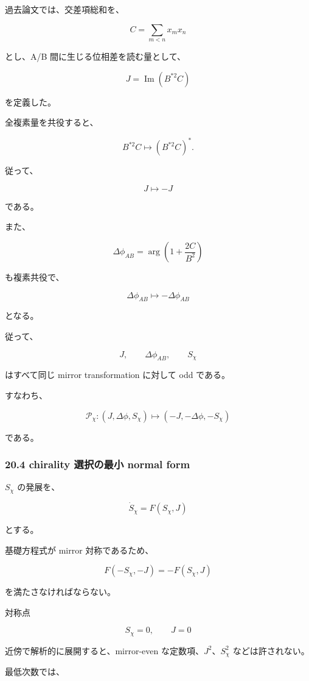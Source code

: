 \documentclass[
  a4paper,
]{ltjsarticle}
\begin{document}
過去論文では、交差項総和を、

\[
C
=
\sum_{m<n}x_mx_n
\]

とし、A/B 間に生じる位相差を読む量として、

\[
\boxed{
J
=
\operatorname{Im}
\left(
B^{*2}C
\right)
}
\tag{156}
\]

を定義した。

全複素量を共役すると、

\[
B^{*2}C
\mapsto
\left(B^{*2}C\right)^*.
\]

従って、

\[
\boxed{
J\mapsto-J
}
\tag{157}
\]

である。

また、

\[
\Delta\phi_{AB}
=
\arg
\left(
1+\frac{2C}{B^2}
\right)
\]

も複素共役で、

\[
\boxed{
\Delta\phi_{AB}
\mapsto
-\Delta\phi_{AB}
}
\tag{158}
\]

となる。

従って、

\[
J,
\qquad
\Delta\phi_{AB},
\qquad
S_\chi
\]

はすべて同じ mirror transformation に対して odd である。

すなわち、

\[
\boxed{
\mathcal P_\chi:
(J,\Delta\phi,S_\chi)
\mapsto
(-J,-\Delta\phi,-S_\chi)
}
\tag{159}
\]

である。

\subsubsection{20.4 chirality 選択の最小 normal
form}\label{chirality-ux9078ux629eux306eux6700ux5c0f-normal-form}

\(S_\chi\) の発展を、

\[
\dot S_\chi
=
F(S_\chi,J)
\]

とする。

基礎方程式が mirror 対称であるため、

\[
\boxed{
F(-S_\chi,-J)
=
-F(S_\chi,J)
}
\tag{160}
\]

を満たさなければならない。

対称点

\[
S_\chi=0,
\qquad
J=0
\]

近傍で解析的に展開すると、mirror-even な定数項、\(J^2\)、\(S_\chi^2\)
などは許されない。

最低次数では、
\end{document}
